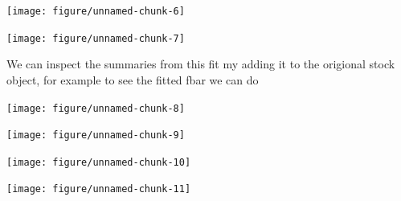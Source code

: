 \documentclass[a4paper,english,10pt]{article}\usepackage[]{graphicx}\usepackage[]{color}
\newenvironment{knitrout}{}{} %
\begin{document}
\begin{knitrout}
\color{fgcolor}

{\centering \texttt{[image: figure/unnamed-chunk-6]} 

}



\end{knitrout}


\begin{knitrout}
\color{fgcolor}

{\centering \texttt{[image: figure/unnamed-chunk-7]} 

}



\end{knitrout}


We can inspect the summaries from this fit my adding it to the origional stock object, for example to see the fitted fbar we can do

\begin{knitrout}
\color{fgcolor}

{\centering \texttt{[image: figure/unnamed-chunk-8]} 

}



\end{knitrout}


\begin{knitrout}
\color{fgcolor}

{\centering \texttt{[image: figure/unnamed-chunk-9]} 

}



\end{knitrout}


\begin{knitrout}
\color{fgcolor}

{\centering \texttt{[image: figure/unnamed-chunk-10]} 

}



\end{knitrout}


\begin{knitrout}
\color{fgcolor}

{\centering \texttt{[image: figure/unnamed-chunk-11]} 

}



\end{knitrout}
\end{document}
